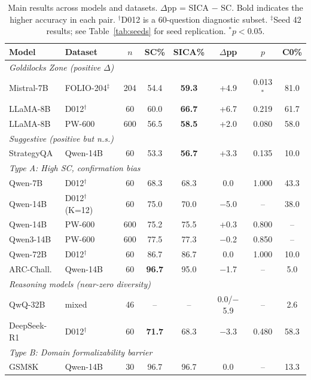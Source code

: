 \documentclass[11pt,a4paper]{article}
\begin{document}
\begin{table}[t]
\centering
\small
\caption{Main results across models and datasets. $\Delta$pp = SICA $-$ SC. Bold indicates the higher accuracy in each pair. $^\dagger$D012 is a 60-question diagnostic subset. $^\ddagger$Seed 42 results; see Table~\ref{tab:seeds} for seed replication. $^*$$p < 0.05$.}
\label{tab:main}
\begin{tabular}{llcccccc}
\toprule
\textbf{Model} & \textbf{Dataset} & \textbf{$n$} & \textbf{SC\%} & \textbf{SICA\%} & \textbf{$\Delta$pp} & \textbf{$p$} & \textbf{C0\%} \\
\midrule
\multicolumn{8}{l}{\textit{Goldilocks Zone (positive $\Delta$)}} \\
Mistral-7B & FOLIO-204$^\ddagger$ & 204 & 54.4 & \textbf{59.3} & +4.9 & 0.013$^*$ & 81.0 \\
LLaMA-8B & D012$^\dagger$ & 60 & 60.0 & \textbf{66.7} & +6.7 & 0.219 & 61.7 \\
LLaMA-8B & PW-600 & 600 & 56.5 & \textbf{58.5} & +2.0 & 0.080 & 58.0 \\
\midrule
\multicolumn{8}{l}{\textit{Suggestive (positive but n.s.)}} \\
StrategyQA & Qwen-14B & 60 & 53.3 & \textbf{56.7} & +3.3 & 0.135 & 10.0 \\
\midrule
\multicolumn{8}{l}{\textit{Type A: High SC, confirmation bias}} \\
Qwen-7B & D012$^\dagger$ & 60 & 68.3 & 68.3 & 0.0 & 1.000 & 43.3 \\
Qwen-14B & D012$^\dagger$ (K=12) & 60 & 75.0 & 70.0 & $-$5.0 & -- & 38.0 \\
Qwen-14B & PW-600 & 600 & 75.2 & 75.5 & +0.3 & 0.800 & -- \\
Qwen3-14B & PW-600 & 600 & 77.5 & 77.3 & $-$0.2 & 0.850 & -- \\
Qwen-72B & D012$^\dagger$ & 60 & 86.7 & 86.7 & 0.0 & 1.000 & 10.0 \\
ARC-Chall. & Qwen-14B & 60 & \textbf{96.7} & 95.0 & $-$1.7 & -- & 5.0 \\
\midrule
\multicolumn{8}{l}{\textit{Reasoning models (near-zero diversity)}} \\
QwQ-32B & mixed & 46 & -- & -- & 0.0/$-$5.9 & -- & 2.6 \\
DeepSeek-R1 & D012$^\dagger$ & 60 & \textbf{71.7} & 68.3 & $-$3.3 & 0.480 & 58.3 \\
\midrule
\multicolumn{8}{l}{\textit{Type B: Domain formalizability barrier}} \\
GSM8K & Qwen-14B & 30 & 96.7 & 96.7 & 0.0 & -- & 13.3 \\
\bottomrule
\end{tabular}
\end{table}
\end{document}
